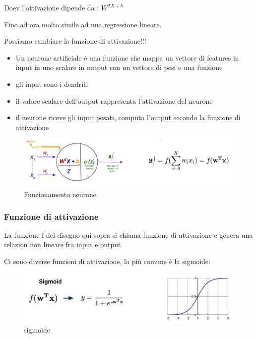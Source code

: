 Doev l'attivazione dipende da : $W^{TX+b}$

Fino ad ora molto simile ad una regressione lineare.

Possiamo cambiare la funzione di attivazione!!!

\begin{itemize}
    \item Un neurone artificiale è una funzione che mappa un vettore di features in input
    in uno scalare in output con un vettore di pesi e una funzione
    \item gli input sono i dendriti
    \item il valore scalare dell'output rappresenta l'attivazione del neurone
    \item il neurone riceve gli input pesati, computa l'output secondo la funzione di attivazione
\end{itemize}

\begin{figure}[H]
    \centering
    \includegraphics[width=0.8\linewidth]{imgs/neurone2}
    \caption{Funzionamento neurone}
    \label{fig:funzionamento_neurone}
\end{figure}

\subsubsection{Funzione di attivazione}
La funzione f del disegno qui sopra si chiama funzione di attivazione e genera
una relazion non lineare fra input e output.

Ci sono diverse funzioni di attivazione, la più comune è la sigmoide:
\begin{figure}[H]
    \centering
    \includegraphics[width=0.7\linewidth]{imgs/sigmoide2}
    \caption{sigmoide}
    \label{fig:sigmoide2}
\end{figure}


